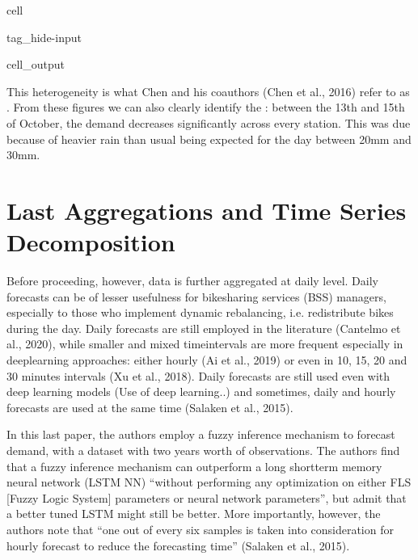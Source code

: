 \documentclass[letterpaper,10pt,english]{jupyterBook}
\begin{document}
\begin{sphinxuseclass}{cell}
\begin{sphinxuseclass}{tag_hide-input}
\begin{sphinxuseclass}{cell_output}
\noindent{}

\noindent{}

\end{sphinxuseclass}
\end{sphinxuseclass}
\end{sphinxuseclass}
\sphinxAtStartPar
This heterogeneity is what Chen and his coauthors (Chen et al., 2016) refer to as . From these figures we can also clearly identify the : between the 13th and 15th of October, the demand decreases significantly across every station. This was due because of heavier rain than usual being expected for the day \sphinxhyphen{} between 20mm and 30mm.


\section{Last Aggregations and Time Series Decomposition}
\label{\detokenize{05-time_series_analysis:last-aggregations-and-time-series-decomposition}}
\sphinxAtStartPar
Before proceeding, however, data is further aggregated at daily level. Daily forecasts can be of lesser usefulness for bike\sphinxhyphen{}sharing services (BSS) managers, especially to those who implement dynamic rebalancing, i.e. redistribute bikes during the day. Daily forecasts are still employed in the literature (Cantelmo et al., 2020), while smaller and mixed time\sphinxhyphen{}intervals are more frequent especially in deep\sphinxhyphen{}learning approaches: either hourly (Ai et al., 2019) or even in 10, 15, 20 and 30 minutes intervals (Xu et al., 2018). Daily forecasts are still used even with deep learning models (Use of deep learning..) and sometimes, daily and hourly forecasts are used at the same time (Salaken et al., 2015).

\sphinxAtStartPar
In this last paper, the authors employ a fuzzy inference mechanism to forecast demand, with a dataset with two years worth of observations. The authors find that a fuzzy inference mechanism can outperform a long short\sphinxhyphen{}term memory neural network (LSTM NN) “without performing any optimization on either FLS {[}Fuzzy Logic System{]} parameters or neural network parameters”, but admit that a better tuned LSTM might still be better. More importantly, however, the authors note that “one out of every six samples is taken into consideration for hourly forecast to reduce the forecasting time” (Salaken et al., 2015).
\end{document}
